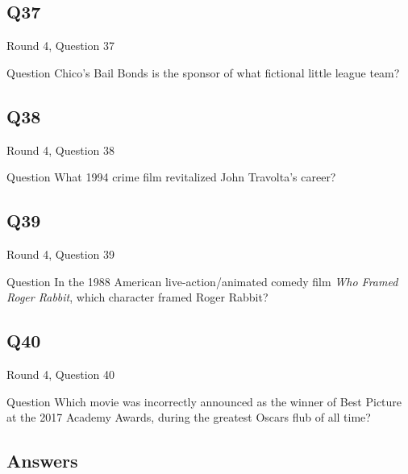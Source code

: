 \documentclass[11pt]{beamer}
\begin{document}
\subsection*{Q37}
\begin{frame}[t]{Round 4, Question 37}
\vspace{2em}
\begin{block}{Question}
Chico's Bail Bonds is the sponsor of what fictional little league team?
\end{block}
\end{frame}
    

\subsection*{Q38}
\begin{frame}[t]{Round 4, Question 38}
\vspace{2em}
\begin{block}{Question}
What 1994 crime film revitalized John Travolta's career?
\end{block}
\end{frame}
    

\subsection*{Q39}
\begin{frame}[t]{Round 4, Question 39}
\vspace{2em}
\begin{block}{Question}
In the 1988 American live-action/animated comedy film \emph{Who Framed Roger Rabbit}, which character framed Roger Rabbit?
\end{block}
\end{frame}
    

\subsection*{Q40}
\begin{frame}[t]{Round 4, Question 40}
\vspace{2em}
\begin{block}{Question}
Which movie was incorrectly announced as the winner of Best Picture at the 2017 Academy Awards, during the greatest Oscars flub of all time?
\end{block}
\end{frame}
    
\subsection{Answers}
\end{document}
